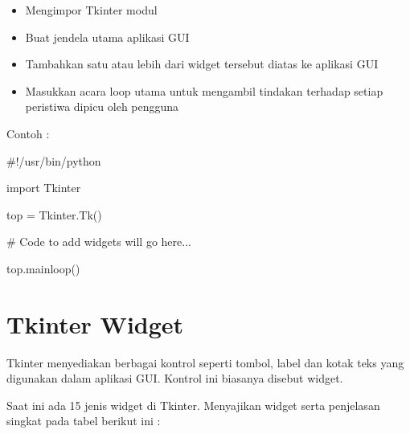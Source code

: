 \documentclass{wileySix}
\begin{document}
\begin{myEnumerate}
\begin{myEnumerate}
{\begin{itemize}
\section{Tkinter Pemrograman}
\par
Tkinter adalah perpustakaan GUI standar untuk Python. Python bila dikombinasikan dengan Tkinter menyediakan cara yang mudah dan cepat untuk membuat aplikasi GUI. Tkinter menyediakan antarmuka berorientasi ojek yang kuat untuk toolkit Tk GUI. \par
\noindent 
\hspace*{0.5in} Membuat aplikasi GUI menggunakan Tkinter adalah tugas yang mudah. Yang diperlukan adalah melakukan langkah-langkah sebagai berikut : \par
\noindent 
\item Mengimpor Tkinter modul \par
\noindent 
\item Buat jendela utama aplikasi GUI \par
\noindent 
\item Tambahkan satu atau lebih dari widget tersebut diatas ke aplikasi GUI \par
\noindent 
\item Masukkan acara loop utama untuk mengambil tindakan terhadap setiap peristiwa dipicu oleh pengguna\end{itemize}
\par
\noindent 
\vspace{12pt}
\vspace{12pt}
\noindent 
Contoh : \par
\noindent 
{\fontsize{10pt}{10pt}\selectfont  $  \#  $!/usr/bin/python} \par
\vspace{10pt}
\noindent 
{\fontsize{10pt}{10pt}\selectfont import Tkinter} \par
\noindent 
{\fontsize{10pt}{10pt}\selectfont top = Tkinter.Tk()} \par
\noindent 
{\fontsize{10pt}{10pt}\selectfont   $  \#  $ Code to add widgets will go here...} \par
\noindent 
{\fontsize{10pt}{10pt}\selectfont top.mainloop()} \par
\vspace{10pt}
\noindent 

\section{Tkinter Widget}
\par
\noindent 
\hspace*{0.5in} Tkinter menyediakan berbagai kontrol seperti tombol, label dan kotak teks yang digunakan dalam aplikasi GUI. Kontrol ini biasanya disebut widget.  \par
\noindent 
\hspace*{0.5in} Saat ini ada 15 jenis widget di Tkinter. Menyajikan widget serta penjelasan singkat pada tabel berikut ini : \par


}
\end{myEnumerate}
\end{myEnumerate}
\end{document}
